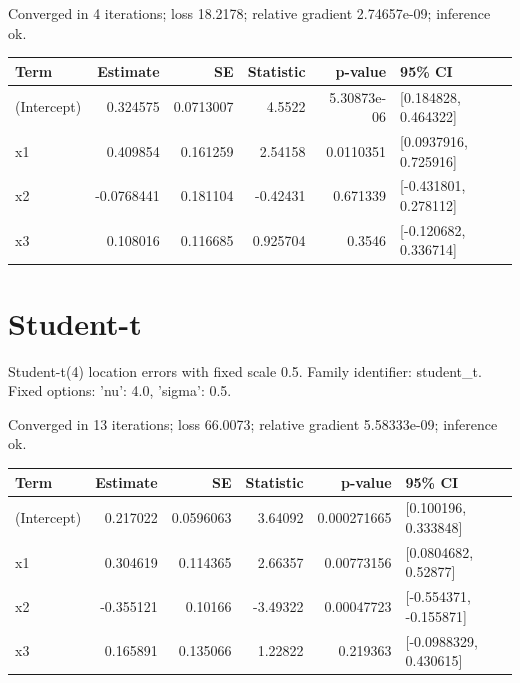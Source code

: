 \documentclass[11pt]{article}
\begin{document}
Converged in 4 iterations; loss 18.2178; relative gradient 2.74657e-09; inference ok.
\begin{center}\small\begin{tabular}{lrrrrl}\toprule
Term & Estimate & SE & Statistic & p-value & 95\% CI \\ \midrule
(Intercept) & 0.324575 & 0.0713007 & 4.5522 & 5.30873e-06 & [0.184828, 0.464322] \\
x1 & 0.409854 & 0.161259 & 2.54158 & 0.0110351 & [0.0937916, 0.725916] \\
x2 & -0.0768441 & 0.181104 & -0.42431 & 0.671339 & [-0.431801, 0.278112] \\
x3 & 0.108016 & 0.116685 & 0.925704 & 0.3546 & [-0.120682, 0.336714] \\
\bottomrule\end{tabular}\end{center}
\section{Student-t}
Student-t(4) location errors with fixed scale 0.5. Family identifier: student\_t. Fixed options: {'nu': 4.0, 'sigma': 0.5}.

Converged in 13 iterations; loss 66.0073; relative gradient 5.58333e-09; inference ok.
\begin{center}\small\begin{tabular}{lrrrrl}\toprule
Term & Estimate & SE & Statistic & p-value & 95\% CI \\ \midrule
(Intercept) & 0.217022 & 0.0596063 & 3.64092 & 0.000271665 & [0.100196, 0.333848] \\
x1 & 0.304619 & 0.114365 & 2.66357 & 0.00773156 & [0.0804682, 0.52877] \\
x2 & -0.355121 & 0.10166 & -3.49322 & 0.00047723 & [-0.554371, -0.155871] \\
x3 & 0.165891 & 0.135066 & 1.22822 & 0.219363 & [-0.0988329, 0.430615] \\
\bottomrule\end{tabular}\end{center}
\end{document}
